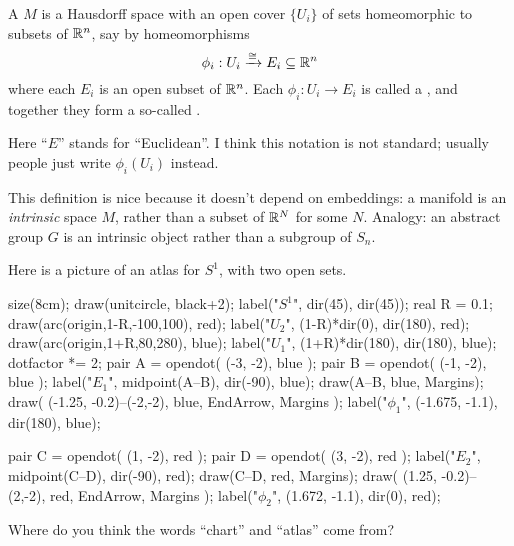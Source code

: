 \begin{definition}
	A  $M$ is a Hausdorff space
	with an open cover $\{U_i\}$ of sets
	homeomorphic to subsets of $\mathbb R^n$,
	say by homeomorphisms
	\[ \phi_i : U_i \xrightarrow{\cong} E_i \subseteq \mathbb R^n \]
	where each $E_i$ is an open subset of $\mathbb R^n$.
	Each $\phi_i : U_i \to E_i$ is called a ,
	and together they form a so-called .
\end{definition}
\begin{remark}
	Here ``$E$'' stands for ``Euclidean''.
	I think this notation is not standard; usually 
	people just write $\phi_i(U_i)$ instead.
\end{remark}
\begin{remark}
	This definition is nice because it doesn't depend on embeddings:
	a manifold is an \emph{intrinsic} space $M$,
	rather than a subset of $\mathbb R^N$ for some $N$.
	Analogy: an abstract group $G$ is an intrinsic object
	rather than a subgroup of $S_n$.
\end{remark}

\begin{example}[An atlas on $S^1$]
Here is a picture of an atlas for $S^1$, with two open sets.
\begin{center}
	\begin{asy}
		size(8cm);
		draw(unitcircle, black+2);
		label("$S^1$", dir(45), dir(45));
		real R = 0.1;
		draw(arc(origin,1-R,-100,100), red);
		label("$U_2$", (1-R)*dir(0), dir(180), red);
		draw(arc(origin,1+R,80,280), blue);
		label("$U_1$", (1+R)*dir(180), dir(180), blue);
		dotfactor *= 2;
		pair A = opendot( (-3, -2), blue );
		pair B = opendot( (-1, -2), blue );
		label("$E_1$", midpoint(A--B), dir(-90), blue);
		draw(A--B, blue, Margins);
		draw( (-1.25, -0.2)--(-2,-2), blue, EndArrow, Margins );
		label("$\phi_1$", (-1.675, -1.1), dir(180), blue);

		pair C = opendot( (1, -2), red );
		pair D = opendot( (3, -2), red );
		label("$E_2$", midpoint(C--D), dir(-90), red);
		draw(C--D, red, Margins);
		draw( (1.25, -0.2)--(2,-2), red, EndArrow, Margins );
		label("$\phi_2$", (1.672, -1.1), dir(0), red);
	\end{asy}
\end{center}
\end{example}

\begin{ques}
	Where do you think the words ``chart'' and ``atlas'' come from?
\end{ques}

